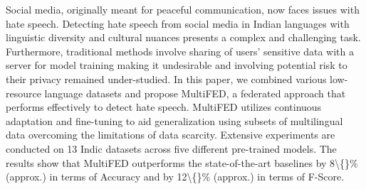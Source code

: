 Social media, originally meant for peaceful communication, now faces issues with hate speech. Detecting hate speech from social media in Indian languages with linguistic diversity and cultural nuances presents a complex and challenging task. Furthermore, traditional methods involve sharing of users' sensitive data with a server for model training making it undesirable and involving potential risk to their privacy remained under-studied. In this paper, we combined various low-resource language datasets and propose MultiFED, a federated approach that performs effectively to detect hate speech. MultiFED utilizes continuous adaptation and fine-tuning to aid generalization using subsets of multilingual data overcoming the limitations of data scarcity. Extensive experiments are conducted on 13 Indic datasets across five different pre-trained models. The results show that MultiFED outperforms the state-of-the-art baselines by 8\textbackslash\{\}\% (approx.) in terms of Accuracy and by 12\textbackslash\{\}\% (approx.) in terms of F-Score.